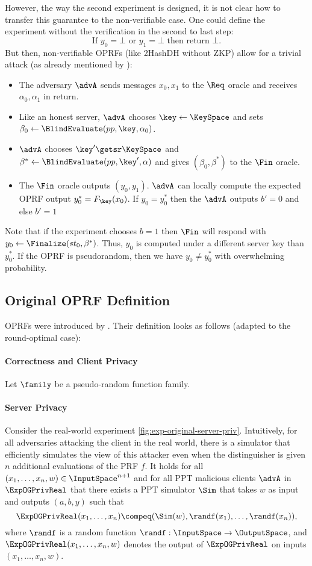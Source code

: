 However, the way the second experiment is designed, it is not clear how to transfer this guarantee to the non-verifiable case. One could define the experiment without the verification in the second to last step:
\[\text{If } y_0 = \bot \text{ or } y_1 = \bot \text{ then return } \bot.\]
But then, non-verifiable OPRFs (like 2HashDH without ZKP) allow for a trivial attack (as already mentioned by \cite{EC:TCRSTW22}):
\begin{itemize}
    \item The adversary $\advA$ sends messages $x_0,x_1$ to the $\Req$ oracle and receives $\alpha_0,\alpha_1$ in return.
    \item Like an honest server, $\advA$ chooses $\key\gets\KeySpace$ and sets $\beta_0\gets\BlindEvaluate(pp,\key,\alpha_0)$.
    \item $\advA$ chooses $\key'\getsr\KeySpace$ and $\beta^*\gets\BlindEvaluate(pp,\key',\alpha)$ and gives $(\beta_0,\beta^*)$ to the $\Fin$ oracle.
    \item The $\Fin$ oracle outputs $(y_0,y_1)$. $\advA$ can locally compute the expected OPRF output $y_0^*=F_\key(x_0)$. If $y_0=y_0^*$ then the $\advA$ outputs $b'=0$ and else $b'=1$
\end{itemize}
Note that if the experiment chooses $b=1$ then $\Fin$ will respond with $y_0\gets\Finalize(st_0,\beta^*)$. Thus, $y_0$ is computed under a different server key than $y_0^*$. If the OPRF is pseudorandom, then we have $y_0\neq y_0^*$ with overwhelming probability.

\subsection{Original OPRF Definition}
\label{sec:original-def}
OPRFs were introduced by \cite{TCC:FreIshPinRei05}. Their definition looks as follows (adapted to the round-optimal case):
\paragraph{Correctness and Client Privacy}
Let $\family$ be a pseudo-random function family.

\paragraph{Server Privacy}
Consider the real-world experiment \cref{fig:exp-original-server-priv}.
Intuitively, for all adversaries attacking the client in the real world, there is a simulator that
efficiently simulates the view of this attacker even when the distinguisher is given $n$ additional evaluations of the PRF $f$.
It holds for all $(x_1,\dots,x_n,w)\in\InputSpace^{n+1}$ and for all PPT malicious clients $\advA$ in $\ExpOGPrivReal$ that there exists a PPT simulator $\Sim$ that takes $w$ as input and outputs $(a,b,y)$
such that 
\[ \ExpOGPrivReal(x_1,\dots,x_n) \compeq (\Sim(w),\randf(x_1),\dots,\randf(x_n)),\]
where $\randf$ is a random function $\randf:\InputSpace\to\OutputSpace$, and $\ExpOGPrivReal(x_1,\dots,x_n,w)$ denotes the output of $\ExpOGPrivReal$ on inputs $(x_1,\dots,x_n,w)$.

